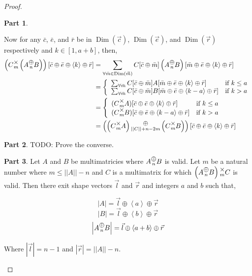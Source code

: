 \documentclass[12pt]{book}
\theoremstyle{plain}
\theoremstyle{definition}
\theoremstyle{ppart}
\newtheorem{ppart}{Part}
\theoremstyle{case}
\theoremstyle{solution}
\DeclareMathOperator{\Dim}{Dim}
\newcommand{\mmult}[1]{\text{\raisebox{1ex}{$\underset{#1}{\times}$}}}
\newcommand{\mconcat}[1]{\text{\raisebox{1ex}{$\underset{#1}{\oplus}$}}}
\newcommand{\shape}[1]{\left|#1\right|}
\begin{document}
\begin{proof}
\begin{ppart}
\begin{landscape}
Now for any $\bar{c}$, $\bar{e}$, and $\bar{r}$ be in $\Dim(\vec{c})$, $\Dim(\vec{e})$,
and $\Dim(\vec{r})$ respectively and $k \in [1,a+b]$, then,
\begin{align*}
  \left(C \mmult{m} \left(A \mconcat{n} B\right)\right)[\bar{c} \oplus \bar{e} \oplus \left<k\right> \oplus \bar{r}]
  &= \sum_{\forall \bar{m} \in \Dim(\vec{m})} C[\bar{c} \oplus \bar{m}] \left(A \mconcat{n} B\right)[\bar{m} \oplus \bar{e} \oplus \left<k\right> \oplus \bar{r}] \\
  &= \left\{
  \begin{array}{ll}
    \sum_{\forall \bar{m}} C[\bar{c} \oplus \bar{m}] A[\bar{m} \oplus \bar{e} \oplus \left<k\right> \oplus \bar{r}]
    & \mbox{if } k \le a \\
    \sum_{\forall \bar{m}} C[\bar{c} \oplus \bar{m}] B[\bar{m} \oplus \bar{e} \oplus \left<k-a\right> \oplus \bar{r}]
    & \mbox{if } k > a
  \end{array}
  \right. \\
  &= \left\{
  \begin{array}{ll}
    (C \mmult{m} A)[\bar{c} \oplus \bar{e} \oplus \left<k\right> \oplus \bar{r}]
    & \mbox{if } k \le a \\
    (C \mmult{m} B)[\bar{c} \oplus \bar{e} \oplus \left<k-a\right> \oplus \bar{r}]
    & \mbox{if } k > a
  \end{array}
  \right. \\
  &= \left(\left(C \mmult{m} A\right) \mconcat{\shape{\shape{C}}+n-2m} \left(C \mmult{m} B\right)\right)[\bar{c} \oplus \bar{e} \oplus \left<k\right> \oplus \bar{r}]
\end{align*}
\end{landscape}
\end{ppart}
\begin{ppart}
TODO: Prove the converse.
\end{ppart}
\begin{ppart}
Let $A$ and $B$ be multimatricies where $A \mconcat{n} B$ is valid. 
Let $m$ be a natural number where $m \le \shape{\shape{A}}-n$
and $C$ is a multimatrix for which $\left(A \mconcat{n} B\right) \mmult{m} C$ is valid.
Then there exit shape vectors $\vec{l}$ and $\vec{r}$ and integers $a$ and $b$ such that,

\[ \shape{A} = \vec{l} \oplus \left<a\right> \oplus \vec{r} \]
\[ \shape{B} = \vec{l} \oplus \left<b\right> \oplus \vec{r} \]
\[ \shape{A \mconcat{n} B} = \vec{l} \oplus \left<a+b\right> \oplus \vec{r} \]

Where $\shape{\vec{l}} = n-1$ and $\shape{\vec{r}} = \shape{\shape{A}}-n$.


\end{ppart}
\end{proof}
\end{document}
